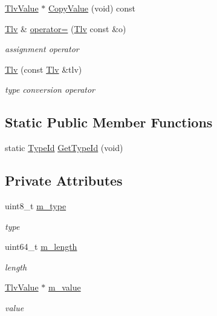 \begin{DoxyCompactItemize}
\hyperlink{classns3_1_1TlvValue}{Tlv\+Value} $\ast$ \hyperlink{classns3_1_1Tlv_a1369b5a4f0649aa8e300ca8b431ab451}{Copy\+Value} (void) const 
\item 
\hyperlink{classns3_1_1Tlv}{Tlv} \& \hyperlink{classns3_1_1Tlv_a461def57cfa930e7687bc4bc68e594d2}{operator=} (\hyperlink{classns3_1_1Tlv}{Tlv} const \&o)
\begin{DoxyCompactList}\small\item\em assignment operator \end{DoxyCompactList}\item 
\hyperlink{classns3_1_1Tlv_a8c43e2ab3dc1e155ffada0d0cc511fde}{Tlv} (const \hyperlink{classns3_1_1Tlv}{Tlv} \&tlv)
\begin{DoxyCompactList}\small\item\em type conversion operator \end{DoxyCompactList}\end{DoxyCompactItemize}
\subsection*{Static Public Member Functions}
\begin{DoxyCompactItemize}
\item 
static \hyperlink{classns3_1_1TypeId}{Type\+Id} \hyperlink{classns3_1_1Tlv_ab9f0ef95ab11d4d33f9f7c12ccad95ba}{Get\+Type\+Id} (void)
\end{DoxyCompactItemize}
\subsection*{Private Attributes}
\begin{DoxyCompactItemize}
\item 
uint8\+\_\+t \hyperlink{classns3_1_1Tlv_a16281bcabeafd34ba3a0f70823295ff2}{m\+\_\+type}
\begin{DoxyCompactList}\small\item\em type \end{DoxyCompactList}\item 
uint64\+\_\+t \hyperlink{classns3_1_1Tlv_a283be5043bd1d6accea0fb54b27824ce}{m\+\_\+length}
\begin{DoxyCompactList}\small\item\em length \end{DoxyCompactList}\item 
\hyperlink{classns3_1_1TlvValue}{Tlv\+Value} $\ast$ \hyperlink{classns3_1_1Tlv_add00ad86b735ae058202b756bdc1d15c}{m\+\_\+value}
\begin{DoxyCompactList}\small\item\em value \end{DoxyCompactList}\end{DoxyCompactItemize}
